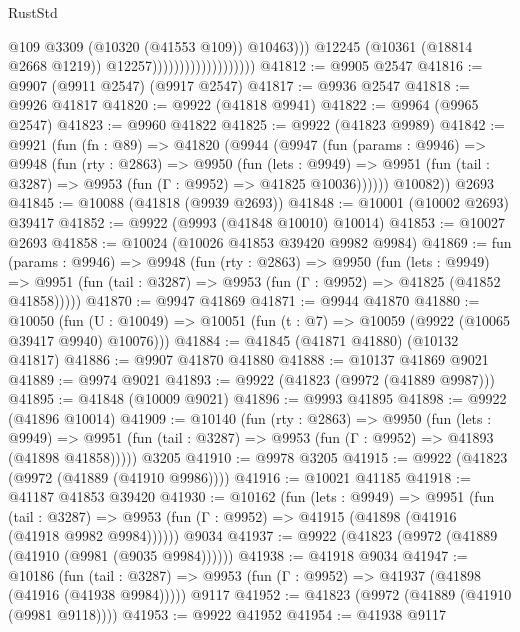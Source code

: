 \begin{lexlean}{RustStd}
\begin{coremodule}
                                                @109
                                                @3309
                                                (@10320 (@41553 @109))
                                                @10463)))
                                          @12245
                                          (@10361 (@18814 @2668 @1219))
                                          @12257)))))))))))))))))))
@41812 := @9905 @2547
@41816 := @9907 (@9911 @2547) (@9917 @2547)
@41817 := @9936 @2547
@41818 := @9926 @41817
@41820 := @9922 (@41818 @9941)
@41822 := @9964 (@9965 @2547)
@41823 := @9960 @41822
@41825 := @9922 (@41823 @9989)
@41842 := @9921
    (fun (fn : @89) =>
    @41820
      (@9944
        (@9947
          (fun (params : @9946) =>
          @9948
            (fun (rty : @2863) =>
            @9950
              (fun (lets : @9949) =>
              @9951 (fun (tail : @3287) => @9953 (fun (Γ : @9952) => @41825 @10036))))))
        @10082))
    @2693
@41845 := @10088 (@41818 (@9939 @2693))
@41848 := @10001 (@10002 @2693) @39417
@41852 := @9922 (@9993 (@41848 @10010) @10014)
@41853 := @10027 @2693
@41858 := @10024 (@10026 @41853 @39420 @9982 @9984)
@41869 := fun (params : @9946) =>
  @9948
    (fun (rty : @2863) =>
    @9950
      (fun (lets : @9949) =>
      @9951 (fun (tail : @3287) => @9953 (fun (Γ : @9952) => @41825 (@41852 @41858)))))
@41870 := @9947 @41869
@41871 := @9944 @41870
@41880 := @10050
    (fun (U : @10049) => @10051 (fun (t : @7) => @10059 (@9922 (@10065 @39417 @9940) @10076)))
@41884 := @41845 (@41871 @41880) (@10132 @41817)
@41886 := @9907 @41870 @41880
@41888 := @10137 @41869 @9021
@41889 := @9974 @9021
@41893 := @9922 (@41823 (@9972 (@41889 @9987)))
@41895 := @41848 (@10009 @9021)
@41896 := @9993 @41895
@41898 := @9922 (@41896 @10014)
@41909 := @10140
    (fun (rty : @2863) =>
    @9950
      (fun (lets : @9949) =>
      @9951 (fun (tail : @3287) => @9953 (fun (Γ : @9952) => @41893 (@41898 @41858)))))
    @3205
@41910 := @9978 @3205
@41915 := @9922 (@41823 (@9972 (@41889 (@41910 @9986))))
@41916 := @10021 @41185
@41918 := @41187 @41853 @39420
@41930 := @10162
    (fun (lets : @9949) =>
    @9951
      (fun (tail : @3287) =>
      @9953 (fun (Γ : @9952) => @41915 (@41898 (@41916 (@41918 @9982 @9984))))))
    @9034
@41937 := @9922 (@41823 (@9972 (@41889 (@41910 (@9981 (@9035 @9984))))))
@41938 := @41918 @9034
@41947 := @10186
    (fun (tail : @3287) => @9953 (fun (Γ : @9952) => @41937 (@41898 (@41916 (@41938 @9984)))))
    @9117
@41952 := @41823 (@9972 (@41889 (@41910 (@9981 @9118))))
@41953 := @9922 @41952
@41954 := @41938 @9117

\end{coremodule}
\end{lexlean}
